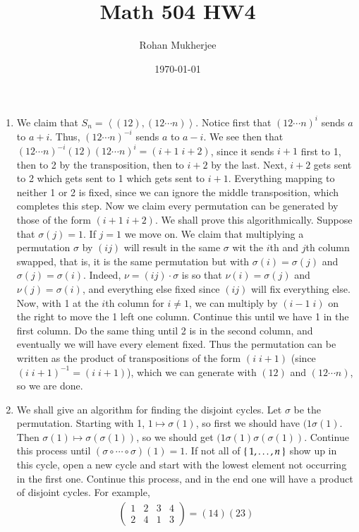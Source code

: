 \documentclass[12pt]{article}
\title{Math 504 HW4}
\date{\today}
\author{Rohan Mukherjee}
\theoremstyle{definitionstyle}
\newcommand{\gen}[1]{\left\langle #1 \right\rangle}
\begin{document}
	\maketitle
	\begin{enumerate}[leftmargin=\labelsep]
		\item We claim that $S_n = \gen{(12), (12 \cdots n)}$. Notice first that $(12 \cdots n)^i$ sends $a$ to $a+i$. Thus, $(12 \cdots n)^{-i}$ sends $a$ to $a-i$. We see then that $(12 \cdots n)^{-i} (12) (12 \cdots n)^{i} = (i+1\; i+2)$, since it sends $i+1$ first to 1, then to 2 by the transposition, then to $i+2$ by the last. Next, $i+2$ gets sent to 2 which gets sent to 1 which gets sent to $i+1$. Everything mapping to neither 1 or 2 is fixed, since we can ignore the middle transposition, which completes this step. Now we claim every permutation can be generated by those of the form $(i+1\; i+2)$. We shall prove this algorithmically. Suppose that $\sigma(j) = 1$. If $j = 1$ we move on. We claim that multiplying a permutation $\sigma$ by $(ij)$ will result in the same $\sigma$ wit the $i$th and $j$th column swapped, that is, it is the same permutation but with $\sigma(i) = \sigma(j)$ and $\sigma(j) = \sigma(i)$. Indeed, $\nu = (ij) \cdot \sigma$ is so that $\nu(i) = \sigma(j)$ and $\nu(j) = \sigma(i)$, and everything else fixed since $(ij)$ will fix everything else. Now, with 1 at the $i$th column for $i \neq 1$, we can multiply by $(i-1 \; i)$ on the right to move the 1 left one column. Continue this until we have 1 in the first column. Do the same thing until 2 is in the second column, and eventually we will have every element fixed. Thus the permutation can be written as the product of transpositions of the form $(i \; i+1)$ (since $(i\; i+1)^{-1} = (i \; i+1)$), which we can generate with $(12)$ and $(12\cdots n)$, so we are done.
		
		\item We shall give an algorithm for finding the disjoint cycles. Let $\sigma$ be the permutation. Starting with 1, $1 \mapsto \sigma(1)$, so first we should have $(1 \sigma(1)$. Then $\sigma(1) \mapsto \sigma(\sigma(1))$, so we should get $(1 \sigma(1) \sigma(\sigma(1))$. Continue this process until $(\sigma \circ \cdots \circ \sigma) (1) = 1$. If not all of $\Set{1, \ldots, n}$ show up in this cycle, open a new cycle and start with the lowest element not occurring in the first one. Continue this process, and in the end one will have a product of disjoint cycles. For example, 
		\begin{align*}
			\begin{pmatrix}
				1 & 2 & 3 & 4\\
				2 & 4 & 1 & 3 
			\end{pmatrix}
			= (14)(23)
		\end{align*}
		

\end{enumerate}
\end{document}
